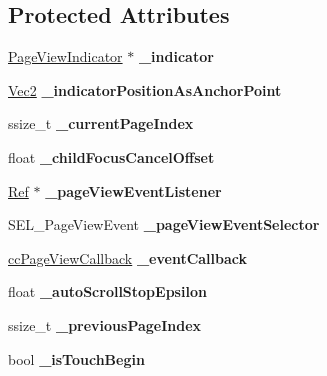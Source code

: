 \subsection*{Protected Attributes}
\begin{DoxyCompactItemize}
\item 
\mbox{\label{classui_1_1PageView_aeb31d94b0c4edeede12973221e544f4b}} 
\hyperlink{classui_1_1PageViewIndicator}{Page\+View\+Indicator} $\ast$ {\bfseries \+\_\+indicator}
\item 
\mbox{\label{classui_1_1PageView_a139e79c6848eb8f25e46073d175e374b}} 
\hyperlink{classVec2}{Vec2} {\bfseries \+\_\+indicator\+Position\+As\+Anchor\+Point}
\item 
\mbox{\label{classui_1_1PageView_aceb881aeec84c245ee6a853947979585}} 
ssize\+\_\+t {\bfseries \+\_\+current\+Page\+Index}
\item 
\mbox{\label{classui_1_1PageView_ae7e09f3381f18ebf53fcde01b0421823}} 
float {\bfseries \+\_\+child\+Focus\+Cancel\+Offset}
\item 
\mbox{\label{classui_1_1PageView_a33b87aa2751b693388ae673f5ce80526}} 
\hyperlink{classRef}{Ref} $\ast$ {\bfseries \+\_\+page\+View\+Event\+Listener}
\item 
\mbox{\label{classui_1_1PageView_a9cc970978d4aa8cb423bc9fbc1038ddf}} 
S\+E\+L\+\_\+\+Page\+View\+Event {\bfseries \+\_\+page\+View\+Event\+Selector}
\item 
\mbox{\label{classui_1_1PageView_a47f9a38790e06fbdb4c3486b89f0cab8}} 
\hyperlink{classui_1_1PageView_a1cbaf2e41005380574beae96ac2bc136}{cc\+Page\+View\+Callback} {\bfseries \+\_\+event\+Callback}
\item 
\mbox{\label{classui_1_1PageView_a446dd219a8302bf49cf8355c583c17df}} 
float {\bfseries \+\_\+auto\+Scroll\+Stop\+Epsilon}
\item 
\mbox{\label{classui_1_1PageView_a7973eec9dd381c92b2906c5795fbe078}} 
ssize\+\_\+t {\bfseries \+\_\+previous\+Page\+Index}
\item 
\mbox{\label{classui_1_1PageView_aa11d5cd65e717e41d4d57d56060bc653}} 
bool {\bfseries \+\_\+is\+Touch\+Begin}
\end{DoxyCompactItemize}
